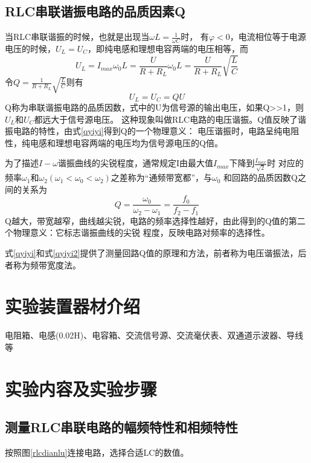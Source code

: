 \documentclass{ctexart}
\begin{document}
  \subsection{RLC串联谐振电路的品质因素Q}
  当RLC串联谐振的时候，也就是出现当$\omega L = \frac{1}{\omega C}$时，
  有$\varphi < 0$，电流相位等于电源电压的时候，$U_{L}=U_{C}$，即纯电感和理想电容两端的电压相等，而
  \begin{equation}
    U_{L}=I_{max}\omega_{0}L=\frac{U}{R+R_{L}}\omega_{0} L=\frac{U}{R+R_{L}}\sqrt{\frac{L}{C}}
  \end{equation}
  令$Q=\frac{1}{R+R_{L}} \sqrt{\frac{L}{C}}$则有
  \begin{equation}\label{qyiyi}
    U_{L}=U_{C}=QU
  \end{equation}
  Q称为串联谐振电路的品质因数，式中的U为信号源的输出电压，如果Q>>1，则$U_{L}$和$U_{C}$都远大于信号源电压。
  这种现象叫做RLC电路的电压谐振。Q值反映了谐振电路的特性，由式\ref{qyiyi}得到Q的一个物理意义：
  电压谐振时，电路呈纯电阻性，纯电感和理想电容两端的电压均为信号源电压的Q倍。

  为了描述$I-\omega$谐振曲线的尖锐程度，通常规定I由最大值$I_{max}$下降到$\frac{I_{max}}{\sqrt{2}}$时
  对应的频率$\omega_{1}$和$\omega_{2}(\omega_{1}<\omega_{0}<\omega_{2})$之差称为“通频带宽都”，与$\omega_{0}$
  和回路的品质因数Q之间的关系为
  \begin{equation}\label{qyiyi2}
    Q=\frac{\omega_{0}}{\omega_{2} - \omega_{1}}=\frac{f_{0}}{f_{2}-f_{1}}
  \end{equation}
  Q越大，带宽越窄，曲线越尖锐，电路的频率选择性越好，由此得到的Q值的第二个物理意义：它标志谐振曲线的尖锐
  程度，反映电路对频率的选择性。

  式\ref{qyiyi}和式\ref{qyiyi2}提供了测量回路Q值的原理和方法，前者称为电压谐振法，后者称为频带宽度法。

\section{实验装置器材介绍}
电阻箱、电感(0.02H)、电容箱、交流信号源、交流毫伏表、双通道示波器、导线等

\section{实验内容及实验步骤}
  \subsection{测量RLC串联电路的幅频特性和相频特性}
   按照图\ref{rlcdianlu}连接电路，选择合适LC的数值。
\end{document}

